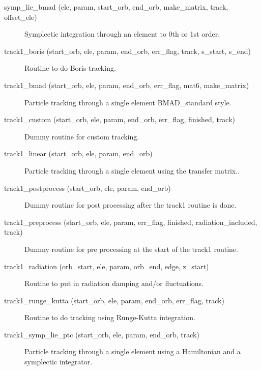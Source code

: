 \begin{description}

\label{r:symp.lie.bmad}
\item[symp_lie_bmad (ele, param, start_orb, end_orb, make_matrix, track, offset_ele)] \Newline
Symplectic integration through an element to 0th or 1st order.

\label{r:track1.boris}
\item[track1_boris (start_orb, ele, param, end_orb, err_flag, track, s_start, s_end)] \Newline
Routine to do Boris tracking.  

\label{r:track1.bmad}
\item[track1_bmad (start_orb, ele, param, end_orb, err_flag, mat6, make_matrix)] \Newline
Particle tracking through a single element BMAD_standard style. 

\item[track1_custom (start_orb, ele, param, end_orb, err_flag, finished, track)] \Newline
Dummy routine for custom tracking.

\label{r:track1.linear}
\item[track1_linear (start_orb, ele, param, end_orb)] \Newline
Particle tracking through a single element using the transfer matrix.. 

\item[track1_postprocess (start_orb, ele, param, end_orb)] \Newline 
Dummy routine for post processing after the track1 routine is done.

\item[track1_preprocess (start_orb, ele, param, err_flag, finished, radiation_included, track)] \Newline 
Dummy routine for pre processing at the start of the track1 routine.

\label{r:track1.radiation}
\item[track1_radiation (orb_start, ele, param, orb_end, edge, z_start)] \Newline
Routine to put in radiation damping and/or fluctuations. 

\label{r:track1.runge.kutta}
\item[track1_runge_kutta (start_orb, ele, param, end_orb, err_flag, track)] \Newline
Routine to do tracking using Runge-Kutta integration. 

\label{r:track1.symp.lie.ptc}
\item[track1_symp_lie_ptc (start_orb, ele, param, end_orb, track)] \Newline
Particle tracking through a single element using a Hamiltonian and a 
symplectic integrator. 


\end{description}
